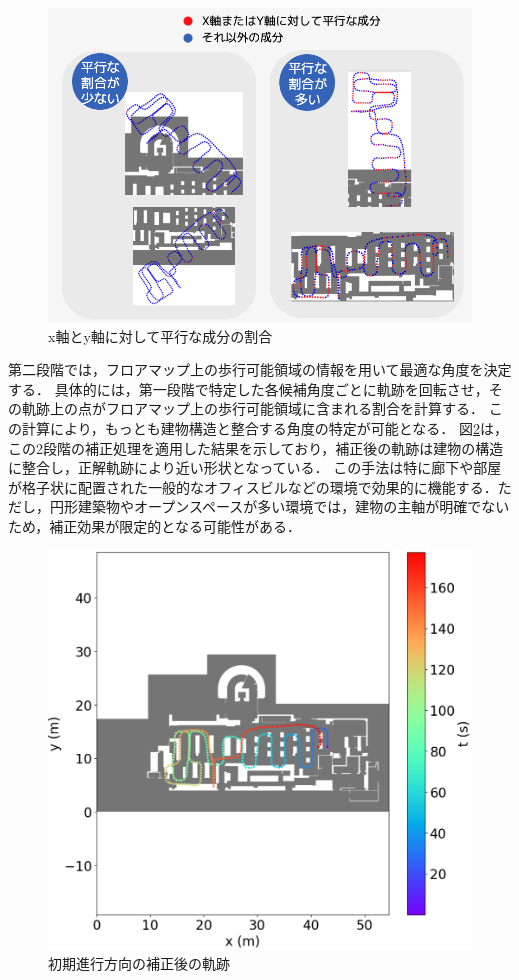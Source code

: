 \begin{figure}[H]
	\centering
	\includegraphics[width=\linewidth]{../image/parallel.jpg}
	\caption{x軸とy軸に対して平行な成分の割合}    \label{fig:parallel}
\end{figure}


第二段階では，フロアマップ上の歩行可能領域の情報を用いて最適な角度を決定する．
具体的には，第一段階で特定した各候補角度ごとに軌跡を回転させ，その軌跡上の点がフロアマップ上の歩行可能領域に含まれる割合を計算する．
この計算により，もっとも建物構造と整合する角度の特定が可能となる．
図\ref{fig:pdr-rotate}は，この2段階の補正処理を適用した結果を示しており，補正後の軌跡は建物の構造に整合し，正解軌跡により近い形状となっている．
この手法は特に廊下や部屋が格子状に配置された一般的なオフィスビルなどの環境で効果的に機能する．ただし，円形建築物やオープンスペースが多い環境では，建物の主軸が明確でないため，補正効果が限定的となる可能性がある．


\begin{figure}[H]
	\centering
	\includegraphics[width=\linewidth]{../image/pdr-rotate.jpg}
	\caption{初期進行方向の補正後の軌跡}    \label{fig:pdr-rotate}
\end{figure}



